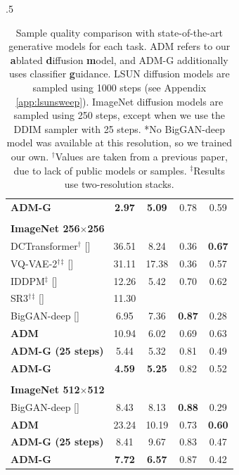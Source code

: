 \documentclass{article}
\newcommand{\shortcite}[1]{[\citenum{#1}]}
\newcommand{\ablaname}{ADM}
\newcommand{\guidedname}{ADM-G}
\begin{document}
\begin{table}[t]
\begin{center}
\begin{small}
\begin{subtable}[t]{.5\linewidth}
\begin{tabular}[t]{lcccc}
    \bf{\guidedname{}}                & \bf{2.97}	 & \bf{5.09}     & 0.78          & 0.59          \\
    \\
    \multicolumn{5}{l}{\bf{ImageNet} 256$\times$256} \\
    \toprule
    DCTransformer${}^\dagger$ \shortcite{dctransformer}            & 36.51         & 8.24          & 0.36          & \bf{0.67}  \\
    VQ-VAE-2${}^\dagger{}^\ddag$ \shortcite{vqvae2} & 31.11 & 17.38 & 0.36 & 0.57 \\
    IDDPM${}^\ddag$ \shortcite{improved} & 12.26 & 5.42 & 0.70 & 0.62 \\
    SR3${}^\dagger{}^\ddag$ \shortcite{sr3} & 11.30 & & & \\
    BigGAN-deep \shortcite{biggan}              & 6.95          & 7.36          & \bf{0.87}     & 0.28       \\
    \bf{\ablaname{}}                     & 10.94         & 6.02          & 0.69          & 0.63       \\
    \bf{\guidedname{} (25 steps)}      & 5.44	         & 5.32          & 0.81	         & 0.49       \\
    \bf{\guidedname{}}                & \bf{4.59}     & \bf{5.25}     & 0.82          & 0.52       \\
    \\
    \multicolumn{5}{l}{\bf{ImageNet} 512$\times$512} \\
    \toprule
    BigGAN-deep \shortcite{biggan}        & 8.43          & 8.13          & \bf{0.88} & 0.29          \\
    \bf{\ablaname{}}                & 23.24         & 10.19         & 0.73      & \bf{0.60}                \\
    \bf{\guidedname{} (25 steps)} & 8.41 &	9.67    & 0.83      & 0.47               \\
    \bf{\guidedname{}}           & \bf{7.72}     & \bf{6.57}     & 0.87      & 0.42               \\
    \end{tabular}
    \end{subtable}
    \end{small}
    \end{center}
    \caption{Sample quality comparison with state-of-the-art generative models for each task. \ablaname{} refers to our \textbf{a}blated \textbf{d}iffusion \textbf{m}odel, and \guidedname{} additionally uses classifier \textbf{g}uidance. LSUN diffusion models are sampled using 1000 steps (see Appendix \ref{app:lsunsweep}). ImageNet diffusion models are sampled using 250 steps, except when we use the DDIM sampler with 25 steps. *No BigGAN-deep model was available at this resolution, so we trained our own. ${}^\dagger$Values are taken from a previous paper, due to lack of public models or samples. ${}^\ddag$Results use two-resolution stacks.}
    \label{tab:sota}
\end{table}
\end{document}
